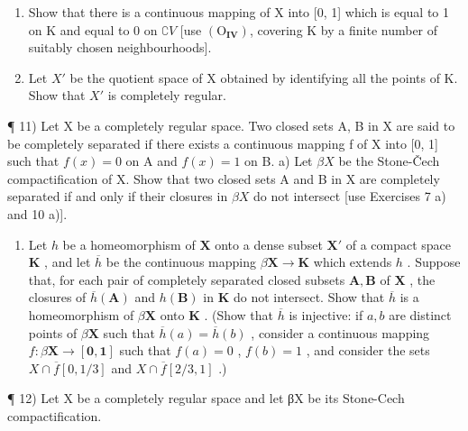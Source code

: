 \begin{enumerate}
\def\labelenumi{\alph{enumi})}
\item
  Show that there is a continuous mapping of X into {[}0, 1{]} which is equal to 1 on K and equal to 0 on \(\complement V\) {[}use \((\mathrm{O}_{\mathbf{IV}})\), covering K by a finite number of suitably chosen neighbourhoods{]}.
\item
  Let \(X'\) be the quotient space of X obtained by identifying all the points of K. Show that \(X'\) is completely regular.
\end{enumerate}

¶ 11) Let X be a completely regular space. Two closed sets A, B in X are said to be completely separated if there exists a continuous mapping f of X into {[}0, 1{]} such that \(f(x) = 0\) on A and \(f(x) = 1\) on B. a) Let \(\beta X\) be the Stone-Čech compactification of X. Show that two closed sets A and B in X are completely separated if and only if their closures in \(\beta X\) do not intersect {[}use Exercises 7 a) and 10 a){]}.

\begin{enumerate}
\def\labelenumi{\alph{enumi})}
\setcounter{enumi}{1}
\tightlist
\item
  Let \(h\) be a homeomorphism of \(\mathbf{X}\) onto a dense subset \(\mathbf{X}'\) of a compact space \(\mathbf{K}\) , and let \(\overline{h}\) be the continuous mapping \(\beta \mathbf{X} \to \mathbf{K}\) which extends \(h\) . Suppose that, for each pair of completely separated closed subsets \(\mathbf{A}, \mathbf{B}\) of \(\mathbf{X}\) , the closures of \(\overline{h}(\mathbf{A})\) and \(h(\mathbf{B})\) in \(\mathbf{K}\) do not intersect. Show that \(\overline{h}\) is a homeomorphism of \(\beta \mathbf{X}\) onto \(\mathbf{K}\) . (Show that \(\overline{h}\) is injective: if \(a, b\) are distinct points of \(\beta \mathbf{X}\) such that \(\overline{h}(a) = \overline{h}(b)\) , consider a continuous mapping \(f: \beta \mathbf{X} \to [\mathbf{0}, \mathbf{1}]\) such that \(f(a) = 0\) , \(f(b) = 1\) , and consider the sets \(X \cap \overline{f}[0, 1/3]\) and \(X \cap \overline{f}[2/3, 1]\) .)
\end{enumerate}

¶ 12) Let X be a completely regular space and let βX be its Stone-Cech compactification.

